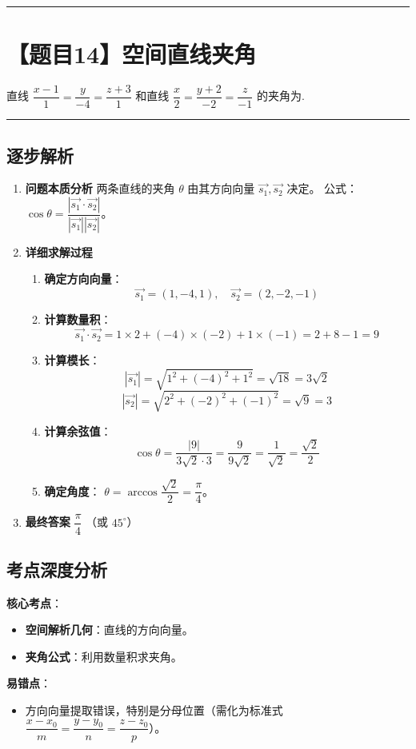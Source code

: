 \documentclass[UTF8,10pt]{ctexart}
\newenvironment{redenv}{\color{red}}{}
\newenvironment{detailedanalysis}{%
    \color{red}
    \begin{enumerate}[label=\textbf{第\arabic*步：}, leftmargin=*, align=left, itemsep=0pt, parsep=0pt, topsep=0pt, partopsep=0pt]
}{%
    \end{enumerate}
}
\newenvironment{conceptbox}{%
    \begin{tcolorbox}[colback=red!5, colframe=red!50!black, title=概念解析, fonttitle=\bfseries, top=2pt, bottom=2pt, left=2pt, right=2pt]
}{%
    \end{tcolorbox}
}
\newcommand{\problemrule}{\par\filbreak\noindent\rule{\textwidth}{1.5pt}\vspace{-0.5em}}
\newcommand{\analysisrule}{\noindent\rule{\textwidth}{0.8pt}\vspace{-0.5em}}
\begin{document}
\problemrule
\section*{【题目14】空间直线夹角}
直线 $\dfrac{x-1}{1} = \dfrac{y}{-4} = \dfrac{z+3}{1}$ 和直线 $\dfrac{x}{2} = \dfrac{y+2}{-2} = \dfrac{z}{-1}$ 的夹角为\underline{\hspace{4cm}}.

\begin{redenv}
\analysisrule
\subsection*{逐步解析}

\begin{detailedanalysis}
\item \textbf{问题本质分析}
两条直线的夹角 $\theta$ 由其方向向量 $\vec{s_1}, \vec{s_2}$ 决定。
公式：$\cos \theta = \dfrac{|\vec{s_1} \cdot \vec{s_2}|}{|\vec{s_1}| |\vec{s_2}|}$。

\item \textbf{详细求解过程}
\begin{enumerate}[label=(\alph*)]
    \item \textbf{确定方向向量}：
    \[ \vec{s_1} = (1, -4, 1), \quad \vec{s_2} = (2, -2, -1) \]
    \item \textbf{计算数量积}：
    \[ \vec{s_1} \cdot \vec{s_2} = 1\times 2 + (-4)\times (-2) + 1\times (-1) = 2 + 8 - 1 = 9 \]
    \item \textbf{计算模长}：
    \[ |\vec{s_1}| = \sqrt{1^2 + (-4)^2 + 1^2} = \sqrt{18} = 3\sqrt{2} \]
    \[ |\vec{s_2}| = \sqrt{2^2 + (-2)^2 + (-1)^2} = \sqrt{9} = 3 \]
    \item \textbf{计算余弦值}：
    \[ \cos \theta = \dfrac{|9|}{3\sqrt{2} \cdot 3} = \dfrac{9}{9\sqrt{2}} = \dfrac{1}{\sqrt{2}} = \dfrac{\sqrt{2}}{2} \]
    \item \textbf{确定角度}：
    $\theta = \arccos \dfrac{\sqrt{2}}{2} = \dfrac{\pi}{4}$。
\end{enumerate}

\item \textbf{最终答案}
$\dfrac{\pi}{4}$ （或 $45^\circ$）
\end{detailedanalysis}

\subsection*{考点深度分析}
\begin{conceptbox}
\textbf{核心考点}：
\begin{itemize}
    \item \textbf{空间解析几何}：直线的方向向量。
    \item \textbf{夹角公式}：利用数量积求夹角。
\end{itemize}
\textbf{易错点}：
\begin{itemize}
    \item 方向向量提取错误，特别是分母位置（需化为标准式 $\dfrac{x-x_0}{m} = \dfrac{y-y_0}{n} = \dfrac{z-z_0}{p}$）。
\end{itemize}
\end{conceptbox}
\end{redenv}
\end{document}

